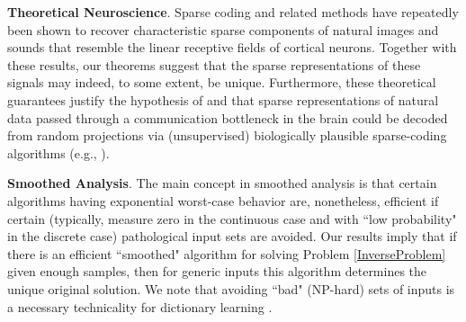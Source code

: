 \documentclass[journal, twocolumn]{IEEEtran}
\begin{document}
\textbf{Theoretical Neuroscience}.
Sparse coding and related methods have repeatedly been shown to recover characteristic sparse components of natural images \cite{Olshausen96, hurri1996image, bell1997independent, van1998independent} and sounds \cite{bellsejnowski1996, smithlewicki2006, Carlson12} that resemble the linear receptive fields of cortical neurons. Together with these results, our theorems suggest that the sparse representations of these signals may indeed, to some extent, be unique. Furthermore, these theoretical guarantees justify the hypothesis of \cite{Coulter10} and \cite{Isely10} that sparse representations of natural data passed through a communication bottleneck in the brain could be decoded from random projections via (unsupervised) biologically plausible sparse-coding algorithms (e.g., \cite{rozell2007neurally, hu2014hebbian}).   %



\textbf{Smoothed Analysis}.
The main concept in smoothed analysis \cite{Spielman04} is that certain algorithms having exponential worst-case behavior are, nonetheless, efficient if certain (typically, measure zero in the continuous case and with ``low probability" in the discrete case) pathological input sets are avoided. Our results imply that if there is an efficient ``smoothed" algorithm for solving Problem \ref{InverseProblem} given enough samples, then for generic inputs this algorithm determines the unique original solution. We note that avoiding ``bad" (NP-hard) sets of inputs is a necessary technicality for dictionary learning \cite{Razaviyayn15, Tillmann15}.

\end{document}
